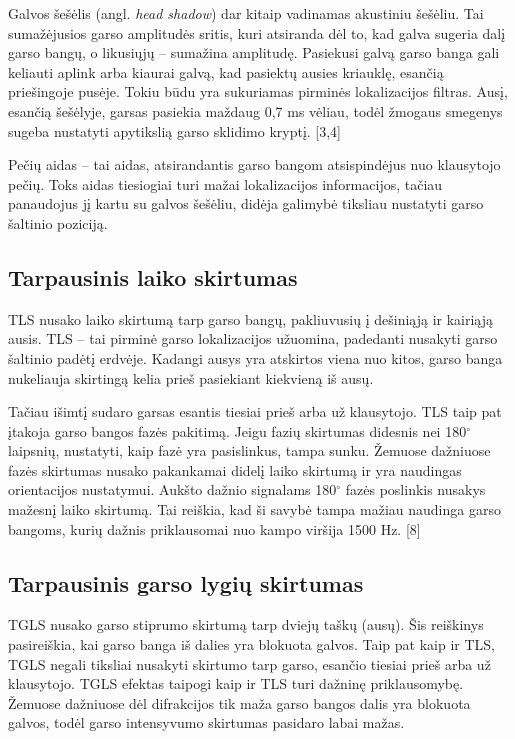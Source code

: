 \documentclass[]{vgtuef}
\begin{document}
Galvos šešėlis (angl. \textit{head shadow}) dar kitaip vadinamas akustiniu šešėliu. Tai sumažėjusios garso amplitudės sritis, kuri atsiranda dėl to, kad galva sugeria dalį garso bangų, o likusiųjų -- sumažina amplitudę. Pasiekusi galvą garso banga gali keliauti aplink arba kiaurai galvą, kad pasiektų ausies kriauklę, esančią priešingoje pusėje. Tokiu būdu yra sukuriamas pirminės lokalizacijos filtras. Ausį, esančią šešėlyje, garsas pasiekia maždaug 0,7 ms vėliau, todėl žmogaus smegenys sugeba nustatyti apytikslią garso sklidimo kryptį. [3,4]

Pečių aidas -- tai aidas, atsirandantis garso bangom atsispindėjus nuo klausytojo pečių. Toks aidas tiesiogiai turi mažai lokalizacijos informacijos, tačiau panaudojus jį kartu su galvos šešėliu, didėja galimybė tiksliau nustatyti garso šaltinio poziciją.


\subsection{Tarpausinis laiko skirtumas}

TLS nusako laiko skirtumą tarp garso bangų, pakliuvusių į dešiniąją ir kairiąją ausis. TLS – tai pirminė garso lokalizacijos užuomina, padedanti nusakyti garso šaltinio padėtį erdvėje. Kadangi ausys yra atskirtos viena nuo kitos, garso banga nukeliauja skirtingą kelia prieš pasiekiant kiekvieną iš ausų.

Tačiau išimtį sudaro garsas esantis tiesiai prieš arba už klausytojo. TLS taip pat įtakoja garso bangos fazės  pakitimą. Jeigu fazių skirtumas didesnis nei 180$^\circ$ laipsnių, nustatyti, kaip fazė yra pasislinkus, tampa sunku. Žemuose dažniuose fazės skirtumas nusako pakankamai didelį laiko skirtumą ir yra naudingas orientacijos nustatymui. Aukšto dažnio signalams 180$^\circ$ fazės poslinkis  nusakys mažesnį laiko skirtumą. Tai reiškia, kad ši savybė tampa mažiau naudinga garso bangoms, kurių dažnis priklausomai nuo kampo viršija 1500 Hz. [8]

\subsection{Tarpausinis garso lygių skirtumas}
TGLS nusako garso stiprumo skirtumą tarp dviejų taškų (ausų). Šis reiškinys pasireiškia, kai garso banga iš dalies yra blokuota galvos. Taip pat kaip ir TLS, TGLS negali tiksliai nusakyti skirtumo tarp garso, esančio tiesiai prieš arba už klausytojo. TGLS efektas taipogi kaip ir TLS turi dažninę priklausomybę. Žemuose dažniuose dėl difrakcijos tik maža garso bangos dalis yra blokuota galvos, todėl garso intensyvumo skirtumas pasidaro labai mažas.
\end{document}
